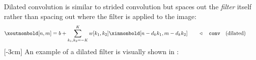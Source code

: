 Dilated convolution is similar to strided convolution but spaces out the \textit{filter} itself rather than spacing out where the filter is applied to the image:
\begin{align}
\xoutnonbold[n,m] =
b + \sum_{k_1,k_2=-K}^K w[k_1,k_2] \xinnonbold[n-d_kk_1,m-d_kk_2] & \quad\quad \triangleleft \quad \texttt{conv}\quad \text{(dilated)}\label{eqn:convolutional_neural_nets:convolutional_filter_dilated}
\end{align}
[-3cm]
An example of a dilated filter is visually shown in \fig{\ref{fig:convolutional_neural_networks:dilated_conv_diagram}}:
